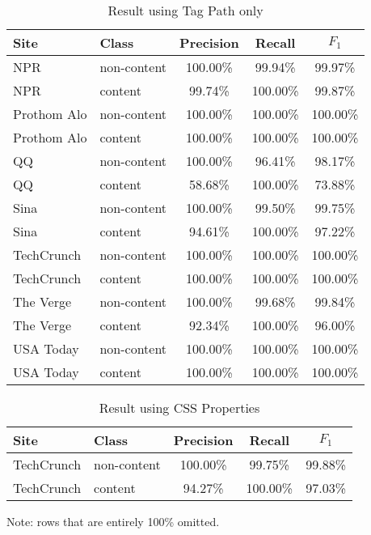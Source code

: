 \documentclass{acm_proc_article-sp}
\begin{document}
\begin{table}
\centering
\caption{\label{table:tagpath}Result using Tag Path only}
\begin{tabular}{|l|l|c|c|c|} \hline
Site&Class&Precision&Recall&$F_1$\\ \hline\hline
NPR&non-content&100.00\%&99.94\%&99.97\%\\ \hline
NPR&content&99.74\%&100.00\%&99.87\%\\ \hline
Prothom Alo&non-content&100.00\%&100.00\%&100.00\%\\ \hline
Prothom Alo&content&100.00\%&100.00\%&100.00\%\\ \hline
QQ&non-content&100.00\%&96.41\%&98.17\%\\ \hline
QQ&content&58.68\%&100.00\%&73.88\%\\ \hline
Sina&non-content&100.00\%&99.50\%&99.75\%\\ \hline
Sina&content&94.61\%&100.00\%&97.22\%\\ \hline
TechCrunch&non-content&100.00\%&100.00\%&100.00\%\\ \hline
TechCrunch&content&100.00\%&100.00\%&100.00\%\\ \hline
The Verge&non-content&100.00\%&99.68\%&99.84\%\\ \hline
The Verge&content&92.34\%&100.00\%&96.00\%\\ \hline
USA Today&non-content&100.00\%&100.00\%&100.00\%\\ \hline
USA Today&content&100.00\%&100.00\%&100.00\%\\ \hline
\end{tabular}
\end{table}

\begin{table}
\centering
\caption{\label{table:css}Result using CSS Properties}
\begin{tabular}{|l|l|c|c|c|} \hline
Site&Class&Precision&Recall&$F_1$\\ \hline\hline
TechCrunch&non-content&100.00\%&99.75\%&99.88\%\\ \hline
TechCrunch&content&94.27\%&100.00\%&97.03\%\\ \hline
\end{tabular}
Note: rows that are entirely 100\% omitted.
\end{table}



\end{document}
